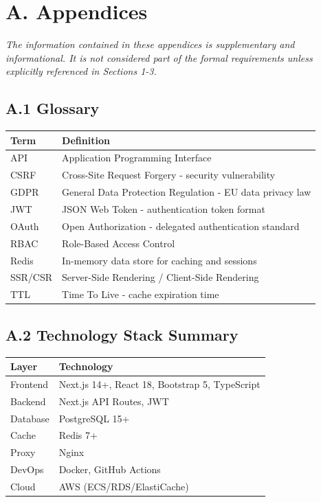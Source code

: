\documentclass[12pt,a4paper]{article}
\begin{document}
\newpage
\section*{A. Appendices}

\textit{The information contained in these appendices is supplementary and informational. It is not considered part of the formal requirements unless explicitly referenced in Sections 1-3.}

\subsection*{A.1 Glossary}

\begin{table}[h]
\centering
\begin{tabular}{|p{3cm}|p{10cm}|}
\hline
\textbf{Term} & \textbf{Definition} \\
\hline
API & Application Programming Interface \\
\hline
CSRF & Cross-Site Request Forgery - security vulnerability \\
\hline
GDPR & General Data Protection Regulation - EU data privacy law \\
\hline
JWT & JSON Web Token - authentication token format \\
\hline
OAuth & Open Authorization - delegated authentication standard \\
\hline
RBAC & Role-Based Access Control \\
\hline
Redis & In-memory data store for caching and sessions \\
\hline
SSR/CSR & Server-Side Rendering / Client-Side Rendering \\
\hline
TTL & Time To Live - cache expiration time \\
\hline
\end{tabular}
\end{table}

\subsection*{A.2 Technology Stack Summary}

\begin{table}[h]
\centering
\begin{tabular}{|p{3cm}|p{10cm}|}
\hline
\textbf{Layer} & \textbf{Technology} \\
\hline
Frontend & Next.js 14+, React 18, Bootstrap 5, TypeScript \\
\hline
Backend & Next.js API Routes, JWT \\
\hline
Database & PostgreSQL 15+ \\
\hline
Cache & Redis 7+ \\
\hline
Proxy & Nginx \\
\hline
DevOps & Docker, GitHub Actions \\
\hline
Cloud & AWS (ECS/RDS/ElastiCache) \\
\hline
\end{tabular}
\end{table}
\end{document}
